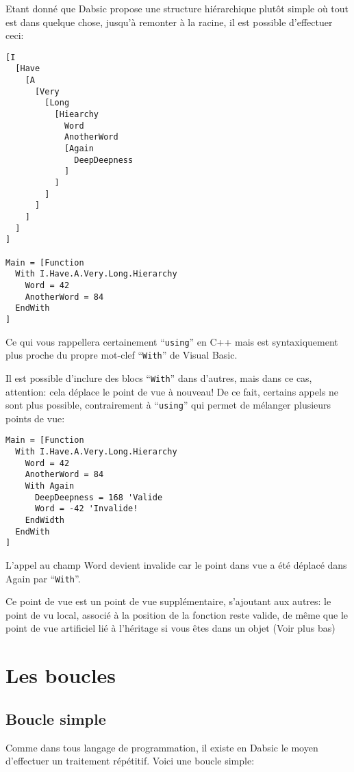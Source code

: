 \documentclass[a5paper, 12pt]{book}
\begin{document}
Etant donné que Dabsic propose une structure hiérarchique
plutôt simple où tout est dans quelque chose, jusqu'à remonter
à la racine, il est possible d'effectuer ceci:\\

\begin{verbatim}
[I
  [Have
    [A
      [Very
        [Long
          [Hiearchy
            Word
            AnotherWord
            [Again
              DeepDeepness
            ]
          ]
        ]
      ]
    ]
  ]
]

Main = [Function
  With I.Have.A.Very.Long.Hierarchy
    Word = 42
    AnotherWord = 84
  EndWith
]
\end{verbatim}

Ce qui vous rappellera certainement ``\verb!using!'' en C++ mais
est syntaxiquement plus proche du propre mot-clef ``\verb!With!''
de Visual Basic.

Il est possible d'inclure des blocs ``\verb!With!'' dans d'autres,
mais dans ce cas, attention: cela déplace le point de vue
à nouveau! De ce fait, certains appels ne sont plus possible,
contrairement à ``\verb!using!'' qui permet de mélanger plusieurs
points de vue:\\

\begin{verbatim}
Main = [Function
  With I.Have.A.Very.Long.Hierarchy
    Word = 42
    AnotherWord = 84
    With Again
      DeepDeepness = 168 'Valide
      Word = -42 'Invalide!
    EndWidth
  EndWith
]
\end{verbatim}

L'appel au champ Word devient invalide car le point dans vue
a été déplacé dans Again par ``\verb!With!''.

Ce point de vue est un point de vue supplémentaire, s'ajoutant
aux autres: le point de vu local, associé à la position
de la fonction reste valide, de même que le point de vue
artificiel lié à l'héritage si vous êtes dans un objet (Voir plus bas)

\section{Les boucles}

\subsection{Boucle simple}

Comme dans tous langage de programmation, il existe en
Dabsic le moyen d'effectuer un traitement répétitif.
Voici une boucle simple:\\
\end{document}
